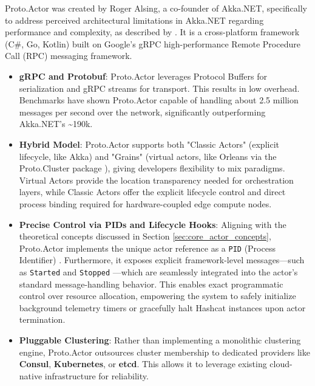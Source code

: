 Proto.Actor was created by Roger Alsing, a co-founder of Akka.NET, specifically to address perceived architectural limitations in Akka.NET regarding performance and complexity, as described by \cite{about_proto_actor}. It is a cross-platform framework (C\#, Go, Kotlin) built on Google's gRPC high-performance Remote Procedure Call (RPC) messaging framework.

\begin{itemize}
    \item \textbf{gRPC and Protobuf}: Proto.Actor leverages Protocol Buffers for serialization and gRPC streams for transport. This results in low overhead. Benchmarks have shown Proto.Actor capable of handling about 2.5 million messages per second over the network, significantly outperforming Akka.NET's \textasciitilde190k.

    \item \textbf{Hybrid Model}: Proto.Actor supports both "Classic Actors" (explicit lifecycle, like Akka) and "Grains" (virtual actors, like Orleans via the Proto.Cluster package \cite{about_proto_cluster}), giving developers flexibility to mix paradigms. Virtual Actors provide the location transparency needed for orchestration layers, while Classic Actors offer the explicit lifecycle control and direct process binding required for hardware-coupled edge compute nodes.

    \item \textbf{Precise Control via PIDs and Lifecycle Hooks}: Aligning with the theoretical concepts discussed in Section \ref{sec:core_actor_concepts}, Proto.Actor implements the unique actor reference as a \verb|PID| (Process Identifier) \cite{proto_actors_docs}. Furthermore, it exposes explicit framework-level messages—such as \verb|Started| and \verb|Stopped| \cite{proto_lifecycle_docs}—which are seamlessly integrated into the actor's standard message-handling behavior. This enables exact programmatic control over resource allocation, empowering the system to safely initialize background telemetry timers or gracefully halt Hashcat instances upon actor termination.

    \item \textbf{Pluggable Clustering}: Rather than implementing a monolithic clustering engine, Proto.Actor outsources cluster membership to dedicated providers like \textbf{Consul}, \textbf{Kubernetes}, or \textbf{etcd}. This allows it to leverage existing cloud-native infrastructure for reliability.
\end{itemize}



